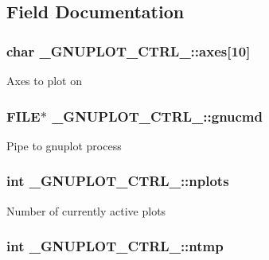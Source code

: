 \subsection{Field Documentation}
\hypertarget{struct__GNUPLOT__CTRL___acba90dc81e974a596a22042d11a6b6f8}{
\subsubsection[{axes}]{\setlength{\rightskip}{0pt plus 5cm}char \-\_\-\-G\-N\-U\-P\-L\-O\-T\-\_\-\-C\-T\-R\-L\-\_\-\-::axes\mbox{[}10\mbox{]}}}\label{struct__GNUPLOT__CTRL___acba90dc81e974a596a22042d11a6b6f8}
Axes to plot on \hypertarget{struct__GNUPLOT__CTRL___aa7a57db92f1f9455de4d6bba134b4824}{
\subsubsection[{gnucmd}]{\setlength{\rightskip}{0pt plus 5cm}F\-I\-L\-E$\ast$ \-\_\-\-G\-N\-U\-P\-L\-O\-T\-\_\-\-C\-T\-R\-L\-\_\-\-::gnucmd}}\label{struct__GNUPLOT__CTRL___aa7a57db92f1f9455de4d6bba134b4824}
Pipe to gnuplot process \hypertarget{struct__GNUPLOT__CTRL___a5b06b0488db37f772b916098c0abd354}{
\subsubsection[{nplots}]{\setlength{\rightskip}{0pt plus 5cm}int \-\_\-\-G\-N\-U\-P\-L\-O\-T\-\_\-\-C\-T\-R\-L\-\_\-\-::nplots}}\label{struct__GNUPLOT__CTRL___a5b06b0488db37f772b916098c0abd354}
Number of currently active plots \hypertarget{struct__GNUPLOT__CTRL___a88196f871d2e10a48c16f7539a04b7c1}{
\subsubsection[{ntmp}]{\setlength{\rightskip}{0pt plus 5cm}int \-\_\-\-G\-N\-U\-P\-L\-O\-T\-\_\-\-C\-T\-R\-L\-\_\-\-::ntmp}}\label{struct__GNUPLOT__CTRL___a88196f871d2e10a48c16f7539a04b7c1}
